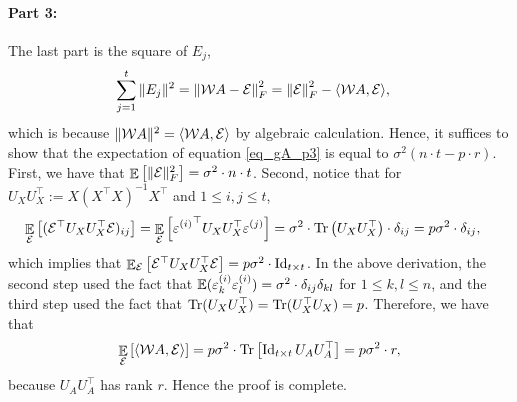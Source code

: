 	\paragraph{Part 3:} The last part is the square of $E_j$,
	\begin{align}\label{eq_gA_p3}
		\sum_{j=1}^t \|E_j\|^2 &= \left\| {\mathcal W} A - \mathcal{E} \right\|_{F}^2
		= \left\| \mathcal{E} \right\|_{F}^2 - \langle {\mathcal W} A, \mathcal{E} \rangle,
	\end{align}
	which is because $\|{\mathcal W} A\|^2 = \langle {\mathcal W} A, \mathcal{E} \rangle$ by algebraic calculation.
	Hence, it suffices to show that the expectation of equation \eqref{eq_gA_p3} is equal to $\sigma^2 (n\cdot t - p\cdot r)$.
	First, we have that $\mathop{\mathbb{E}}\left[ \|\mathcal{E}\|_F^2 \right] = \sigma^2 \cdot n \cdot t$.
	Second, notice that for $U_XU_X^\top:=X(X^{\top} X)^{-1} X^{\top}$ and $1\le i, j \le t$,
	\begin{align*}
			\mathop{\mathbb{E}}_{\mathcal{E}}\left[ (\mathcal{E}^{\top}U_XU_X^\top \mathcal{E})_{ij}  \right]
		&= \mathop{\mathbb{E}}_{\mathcal{E}}\left[ {\varepsilon^{(i)}}^\top U_X U_X^\top  \varepsilon^{(j)}  \right] = \sigma^2 \cdot \operatorname{Tr}\left( U_XU_X^\top \right) \cdot \delta_{ij} = p\sigma^2 \cdot \delta_{ij},
	\end{align*}
	which implies that $\mathop{\mathbb{E}}_{\mathcal{E}}\left[ \mathcal{E}^{\top}U_XU_X^\top \mathcal{E}  \right]=p\sigma^2 \cdot \operatorname{Id}_{t\times t}$.
	In the above derivation, the second step used the fact that $\mathbb{E}(\varepsilon^{(i)}_k \varepsilon^{(i)}_l )=\sigma^2\cdot \delta_{ij}\delta_{kl}$ for $1\le k,l \le n$, and the third step used the fact that $\operatorname{Tr}(U_XU_X^\top) =\operatorname{Tr}(U_X^\top U_X) =p$.
	Therefore, we have that
	\begin{align*}
		\mathop{\mathbb{E}}_{\mathcal{E}}\left[  \langle {\mathcal W} A, \mathcal{E} \rangle \right] = p\sigma^2 \cdot \operatorname{Tr}\left[\operatorname{Id}_{t\times t}U_AU_A^\top\right] =  p \sigma^2 \cdot r ,
			\end{align*}
   because $U_AU_A^\top$ has rank $r$.	
	Hence the proof is complete.
	

